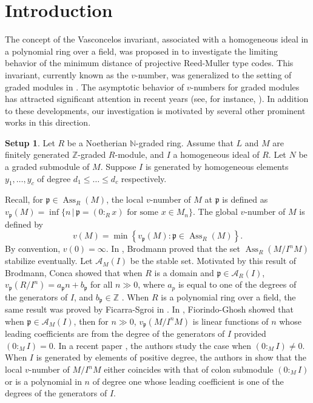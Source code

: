 \documentclass[11pt,reqno]{amsart}
\theoremstyle{definition}
\newtheorem{setup}[theorem]{Setup}
\newcommand{\p}{\mathfrak{p}}
\newcommand{\Z}{\mathbb{Z}}
\newcommand{\N}{\mathbb{N}}
\newcommand{\Ass}{\operatorname{Ass}}
\begin{document}
\section{Introduction}
The concept of the Vasconcelos invariant, associated with a homogeneous ideal in a polynomial ring over a field, was proposed in \cite{CST+20}  to investigate the limiting behavior of the minimum distance of projective Reed-Muller type codes. This invariant, currently known as the $v$-number, was generalized to the setting of graded modules in \cite{FG25}. The asymptotic behavior of $v$-numbers for graded modules has attracted significant attention in recent years (see, for instance, \cite{BMS26, FS25, VS25, FM25, VS24,  Con24, Fic24, FS26}). In addition to these developments, our investigation is motivated by several other prominent works \cite{FG25, GP25, GNP26} in this direction.
\begin{setup}\label{main setup}
     Let $R$ be a Noetherian $\N$-graded ring. Assume that $L$ and  $M$ are finitely generated $\Z$-graded $R$-module, and $I$ a homogeneous ideal of $R$. Let $N$ be a graded submodule of $M$. Suppose $I$ is generated by homogeneous elements $y_1,\ldots,y_c$ of degree $d_1\leq\ldots\leq d_c$ respectively.
\end{setup}
 Recall, for $\p \in \Ass_R(M)$, the  local $v$-number of $M$ at $\p$ is defined as $v_{\p}(M)= \inf\{n\, |\, \p = (0 :_R x)\text{ for some } x \in M_n\}.$
The global $v$-number of $M$ is defined by $$v(M)=\min\left\{v_{\p}(M):\p\in\Ass_R(M)\right\}.$$
By convention, $v(0)=\infty$. 
In \cite{Bro79}, Brodmann proved that the set $\Ass_R(M/I^nM)$ stabilize eventually. Let $\mathcal A_M(I)$ be the stable set. Motivated by this result of Brodmann, Conca showed that when $R$ is a domain and $\p\in \mathcal A_R(I)$, $v_{\p}(R/I^n)=a_\p n+b_\p$  for all $n\gg 0$, where $a_p$ is equal to one of the degrees of the generators of $I$, and $b_\p\in \Z$ \cite[Theorem 1.1]{Con24}. When $R$ is a polynomial ring over a field, the same result was proved by Ficarra-Sgroi in \cite{FS26}. In \cite[Theorem 2.14]{FG25}, Fiorindo-Ghosh showed that when  $\p\in \mathcal A_M(I)$, then for $n\gg 0$, $v_{\p}(M/I^nM)$  is linear functions of $n$ whose leading coefficients are from the degree of the generators of $I$ provided $(0:_MI)=0$. In a recent paper \cite{GNP26}, the authors study the case when $(0:_MI)\neq 0$. When $I$ is generated by elements of positive degree, the authors  in \cite{GNP26} show that the local $v$-number of $M/I^nM$ either coincides with that of colon submodule $(0:_MI)$ or is a polynomial in $n$ of degree one whose leading coefficient is one of the degrees of the generators of $I$.
\end{document}
